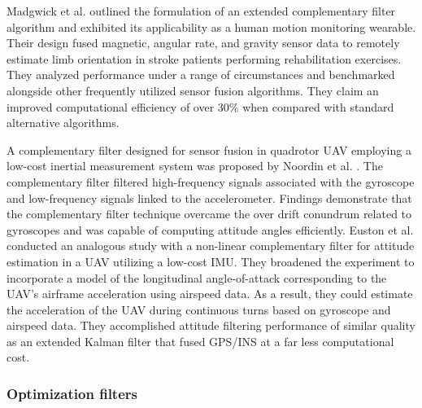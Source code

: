 
Madgwick et al. \cite{madgwick2020extended} outlined the formulation of an extended complementary filter algorithm and exhibited its applicability as a human motion monitoring wearable. Their design fused magnetic, angular rate, and gravity sensor data to remotely estimate limb orientation in stroke patients performing rehabilitation exercises. They analyzed performance under a range of circumstances and benchmarked alongside other frequently utilized sensor fusion algorithms. They claim an improved computational efficiency of over 30\% when compared with standard alternative algorithms.

A complementary filter designed for sensor fusion in quadrotor UAV employing a low-cost inertial measurement system was proposed by Noordin et al. \cite{noordin2018sensor}. The complementary filter filtered high-frequency signals associated with the gyroscope and low-frequency signals linked to the accelerometer. Findings demonstrate that the complementary filter technique overcame the over drift conundrum related to gyroscopes and was capable of computing attitude angles efficiently.
Euston et al. \cite{euston2008complementary} conducted an analogous study with a non-linear complementary filter for attitude estimation in a UAV utilizing a low-cost IMU. They broadened the experiment to incorporate a model of the longitudinal angle-of-attack corresponding to the UAV’s airframe acceleration using airspeed data. As a result, they could estimate the acceleration of the UAV during continuous turns based on gyroscope and airspeed data. They accomplished attitude filtering performance of similar quality as an extended Kalman filter that fused GPS/INS at a far less computational cost.

\subsubsection{Optimization filters}

